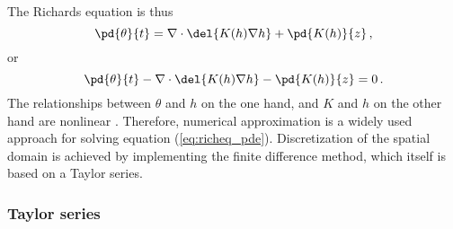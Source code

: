 The Richards equation is thus
\begin{equation}
  \label{eq:richeq_simple}
  \pd{\theta}{t} = \nabla \cdot \del{ K(h) \nabla h } + \pd{K(h)}{z} \, ,
\end{equation}
or
\begin{equation}
  \label{eq:richeq_pde}
  \pd{\theta}{t} - \nabla \cdot \del{ K(h) \nabla h } - \pd{K(h)}{z} = 0 \, .
\end{equation}
The relationships between $\theta$ and $h$ on the one hand, and $K$ and $h$ on the other hand are nonlinear \parencite{celia_general_1990}.  Therefore, numerical approximation is a widely used approach for solving equation (\ref{eq:richeq_pde}).  Discretization of the spatial domain is achieved by implementing the finite difference method, which itself is based on a Taylor series.

\subsubsection{Taylor series}
% 







